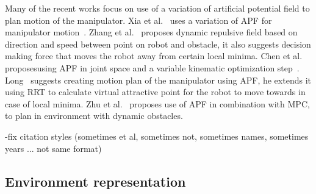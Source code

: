 \documentclass[letterpaper, 10 pt, conference]{ieeeconf}  %
\begin{document}
Many of the recent works focus on use of a variation of artificial potential field to plan motion of the manipulator. Xia et al.~\cite{c49} uses a variation of APF for manipulator motion~\cite{c49}. Zhang et al.~\cite{zhang2021obstacle} proposes dynamic repulsive field based on direction and speed between point on robot and obstacle, it also suggests decision making force that moves the robot away from certain local minima. Chen et al. proposesusing APF in joint space and a variable kinematic optimization step~\cite{c50}. Long~\cite{c44} suggests creating motion plan of the manipulator using APF, he extends it using RRT to calculate virtual attractive point for the robot to move towards in case of local minima. Zhu et al.~\cite{c48} proposes use of APF in combination with MPC, to plan in environment with dynamic obstacles.

\alert{
 -fix citation styles (sometimes et al, sometimes not, sometimes names, sometimes years ... not same format)
}


\subsection{Environment representation}

\end{document}
